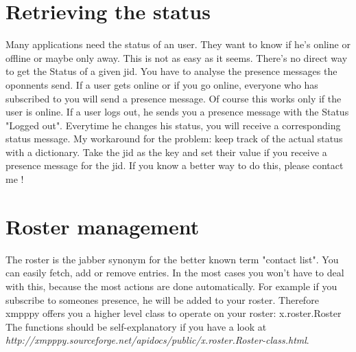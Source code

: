 \section{Retrieving the status}


Many applications need the status of an user. They want to know if he's online or offline or maybe only away.
This is not as easy as it seems. There's no direct way to get the Status of a given jid. You have to analyse the presence messages the oponnents send. If a user gets online or if you go online, everyone who has subscribed to you will send a presence message. Of course this works only if the user is online.
If a user logs out, he sends you a presence message with the Status "Logged out". Everytime he changes his status, you will receive a corresponding status message.
My workaround for the problem: keep track of the actual status with a dictionary. Take the jid as the key
and set their value if you receive a presence message for the jid.
\newline
\newline
If you know a better way to do this, please contact me !
\section{Roster management}


The roster is the jabber synonym for the better known term "contact list". You can easily fetch, add or remove entries.
In the most cases you won't have to deal with this, because the most actions are done automatically.
For example if you subscribe to someones presence, he will be added to your roster.
Therefore xmpppy offers you a higher level class to operate on your roster: x.roster.Roster
The functions should be self-explanatory if you have a look at
\newline \textit{http://xmpppy.sourceforge.net/apidocs/public/x.roster.Roster-class.html}.